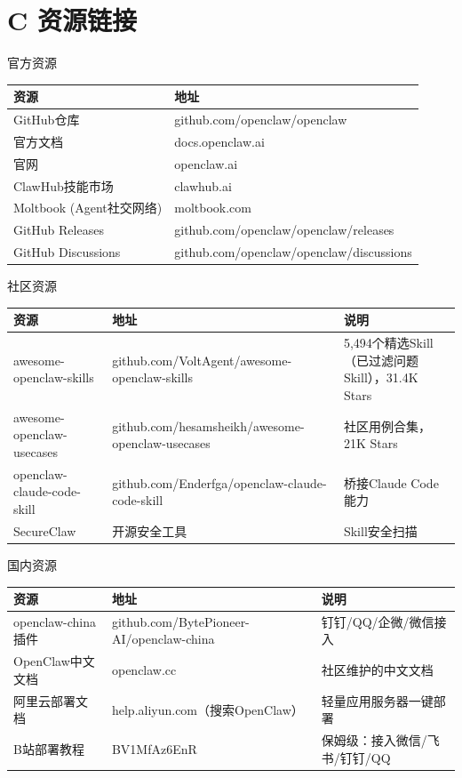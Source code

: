\documentclass[
  10
]{article}
\newcounter{none} %
\begin{document}
\section{C 资源链接}\label{c-ux8d44ux6e90ux94feux63a5}

官方资源

{\def\LTcaptype{none} %
\begin{longtable}[]{@{}|l|l|@{}}
\toprule\noalign{}
\endhead
\bottomrule\noalign{}
\endlastfoot
\hline
资源 & 地址 \\
\hline
GitHub仓库 & github.com/openclaw/openclaw \\
\hline
官方文档 & docs.openclaw.ai \\
\hline
官网 & openclaw.ai \\
\hline
ClawHub技能市场 & clawhub.ai \\
\hline
Moltbook (Agent社交网络) & moltbook.com \\
\hline
GitHub Releases & github.com/openclaw/openclaw/releases \\
\hline
GitHub Discussions & github.com/openclaw/openclaw/discussions \\
\hline
\end{longtable}
}

社区资源

{\def\LTcaptype{none} %
\begin{longtable}[]{@{}|l|l|l|@{}}
\toprule\noalign{}
\endhead
\bottomrule\noalign{}
\endlastfoot
\hline
资源 & 地址 & 说明 \\
\hline
awesome-openclaw-skills & github.com/VoltAgent/awesome-openclaw-skills &
5,494个精选Skill（已过滤问题Skill），31.4K Stars \\
\hline
awesome-openclaw-usecases &
github.com/hesamsheikh/awesome-openclaw-usecases & 社区用例合集，21K
Stars \\
\hline
openclaw-claude-code-skill &
github.com/Enderfga/openclaw-claude-code-skill & 桥接Claude Code能力 \\
\hline
SecureClaw & 开源安全工具 & Skill安全扫描 \\
\hline
\end{longtable}
}

国内资源

{\def\LTcaptype{none} %
\begin{longtable}[]{@{}|l|l|l|@{}}
\toprule\noalign{}
\endhead
\bottomrule\noalign{}
\endlastfoot
\hline
资源 & 地址 & 说明 \\
\hline
openclaw-china插件 & github.com/BytePioneer-AI/openclaw-china &
钉钉/QQ/企微/微信接入 \\
\hline
OpenClaw中文文档 & openclaw.cc & 社区维护的中文文档 \\
\hline
阿里云部署文档 & help.aliyun.com（搜索OpenClaw） &
轻量应用服务器一键部署 \\
\hline
B站部署教程 & BV1MfAz6EnR & 保姆级：接入微信/飞书/钉钉/QQ \\
\hline
\end{longtable}
}
\end{document}
